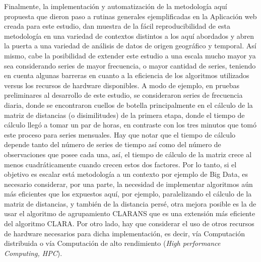 \documentclass[12pt,oneside]{book}\usepackage[]{graphicx}\usepackage[]{color}
\theoremstyle{definition} %
\begin{document}


Finalmente, la implementación y automatización de la metodología aquí propuesta que dieron paso a rutinas generales ejemplificadas en la Aplicación web creada para este estudio, dan muestra de la fácil reproducibilidad de esta metodología en una variedad de contextos distintos a los aquí abordados y abren la puerta a una variedad de análisis de datos de origen geográfico y temporal. 
Así mismo, cabe la posibilidad de extender este estudio a una escala mucho mayor ya sea considerando series de mayor frecuencia, o mayor cantidad de series, teniendo en cuenta algunas barreras en cuanto a la eficiencia de los algoritmos utilizados versus los recursos de hardware disponibles. A modo de ejemplo, en pruebas preliminares al desarrollo de este estudio, se consideraron series de frecuencia diaria, donde se encontraron cuellos de botella principalmente en el cálculo de la matriz de distancias (o disimilitudes) de la primera etapa, donde el tiempo de cálculo llegó a tomar un par de horas, en contraste con los tres minutos que tomó este proceso para series mensuales. Hay que notar que el tiempo de cálculo depende tanto del número de series de tiempo así como del número de observaciones que posee cada una, así, el tiempo de cálculo de la matriz crece al menos cuadráticamente cuando crecen estos dos factores. Por lo tanto, si el objetivo es escalar está metodología a un contexto por ejemplo de Big Data, es necesario considerar, por una parte, la necesidad de implementar algoritmos aún más eficientes que los expuestos aquí, por ejemplo, paralelizando el cálculo de la matriz de distancias, y también de la distancia persé, otra mejora posible es la de usar el algoritmo de agrupamiento CLARANS que es una extensión más eficiente del algoritmo CLARA. Por otro lado, hay que considerar el uso de otros recursos de hardware necesarios para dicha implementación, es decir, vía Computación distribuida o vía Computación de alto rendimiento (\textit{High performance Computing, HPC}).


\end{document}
